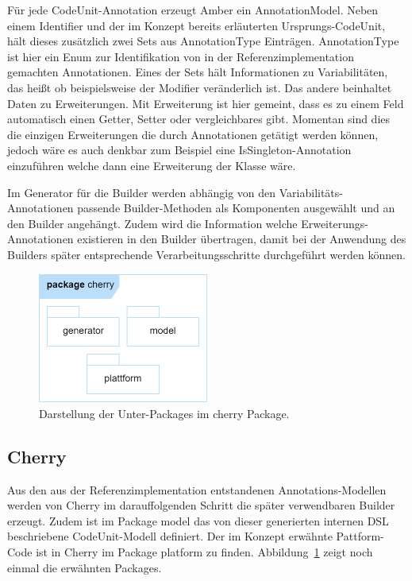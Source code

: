 \documentclass[12pt,oneside,a4paper,parskip]{scrbook}
\begin{document}
Für jede CodeUnit-Annotation erzeugt Amber ein AnnotationModel. Neben einem Identifier und der im Konzept bereits erläuterten Ursprungs-CodeUnit, hält dieses zusätzlich zwei Sets aus AnnotationType Einträgen. AnnotationType ist hier ein Enum zur Identifikation von in der Referenzimplementation gemachten Annotationen. Eines der Sets hält Informationen zu Variabilitäten, das heißt ob beispielsweise der Modifier veränderlich ist. Das andere beinhaltet Daten zu Erweiterungen. Mit Erweiterung ist hier gemeint, dass es zu einem Feld automatisch einen Getter, Setter oder vergleichbares gibt. Momentan sind dies die einzigen Erweiterungen die durch Annotationen getätigt werden können, jedoch wäre es auch denkbar zum Beispiel eine IsSingleton-Annotation einzuführen welche dann eine Erweiterung der Klasse wäre.

Im Generator für die Builder werden abhängig von den Variabilitäts-Annotationen passende Builder-Methoden als Komponenten ausgewählt und an den Builder angehängt. Zudem wird die Information welche Erweiterungs-Annotationen existieren in den Builder übertragen, damit bei der Anwendung des Builders später entsprechende Verarbeitungsschritte durchgeführt werden können.

\begin{figure}[htbp]
	\centering
	\includegraphics[width=0.5\textwidth]{bilder/cherry}
	\caption{Darstellung der Unter-Packages im cherry Package.}
	\label{fig:cherryPackages}
\end{figure}

\subsection{Cherry}

Aus den aus der Referenzimplementation entstandenen Annotations-Modellen werden von Cherry im darauffolgenden Schritt die später verwendbaren Builder erzeugt. Zudem ist im Package model das von dieser generierten internen DSL beschriebene CodeUnit-Modell definiert. Der im Konzept erwähnte Pattform-Code ist in Cherry im Package platform zu finden. Abbildung~\ref{fig:cherryPackages} zeigt noch einmal die erwähnten Packages.
\end{document}
